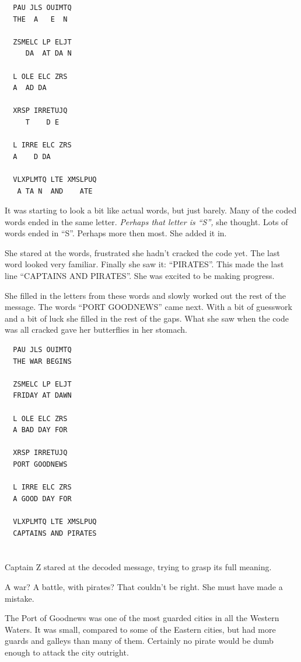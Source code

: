 \documentclass[12pt]{extbook}
\begin{document}
  \begin{lstlisting}
  PAU JLS OUIMTQ
  THE  A   E  N
  
  ZSMELC LP ELJT
     DA  AT DA N
  
  L OLE ELC ZRS
  A  AD DA
  
  XRSP IRRETUJQ
     T    D E
  
  L IRRE ELC ZRS
  A    D DA
  
  VLXPLMTQ LTE XMSLPUQ
   A TA N  AND    ATE
  \end{lstlisting}
  
  It was starting to look a bit like actual words, but just barely. Many
  of the coded words ended in the same letter. \emph{Perhaps that letter
  is \enquote{S},} she thought. Lots of words ended in \enquote{S}.
  Perhaps more then most. She added it in.
  
  She stared at the words, frustrated she hadn't cracked the code yet. The
  last word looked very familiar. Finally she saw it: \enquote{PIRATES}.
  This made the last line \enquote{CAPTAINS AND PIRATES}. She was excited
  to be making progress.
  
  She filled in the letters from these words and slowly worked out the
  rest of the message. The words \enquote{PORT GOODNEWS} came next. With a
  bit of guesswork and a bit of luck she filled in the rest of the gaps.
  What she saw when the code was all cracked gave her butterflies in her
  stomach.
  
  \begin{lstlisting}
  PAU JLS OUIMTQ
  THE WAR BEGINS
  
  ZSMELC LP ELJT
  FRIDAY AT DAWN
  
  L OLE ELC ZRS
  A BAD DAY FOR
  
  XRSP IRRETUJQ
  PORT GOODNEWS
  
  L IRRE ELC ZRS
  A GOOD DAY FOR
  
  VLXPLMTQ LTE XMSLPUQ
  CAPTAINS AND PIRATES
  \end{lstlisting}
  
  \section{}\label{section-31}
  
  Captain Z stared at the decoded message, trying to grasp its full
  meaning.
  
  A war? A battle, with pirates? That couldn't be right. She must have
  made a mistake.
  
  The Port of Goodnews was one of the most guarded cities in all the
  Western Waters. It was small, compared to some of the Eastern cities,
  but had more guards and galleys than many of them. Certainly no pirate
  would be dumb enough to attack the city outright.
  
\end{document}
